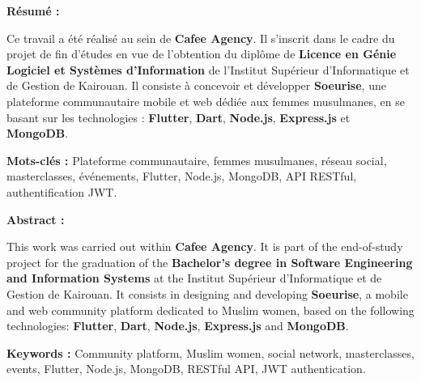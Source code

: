 \documentclass[12pt,a4paper]{report}
\begin{document}
\begin{tcolorbox}[enhanced,colback=white,colframe=cafeeNavy,boxrule=1pt,arc=4pt,left=10pt,right=10pt,top=10pt,bottom=10pt]
	\textbf{\large Résumé :}
	
	\medskip
	
	Ce travail a été réalisé au sein de \textbf{Cafee Agency}. Il s'inscrit dans le cadre du projet de fin d'études en vue de l'obtention 
	du diplôme de \textbf{Licence en Génie Logiciel et Systèmes d'Information} de 
	l'Institut Supérieur d'Informatique et de Gestion de Kairouan. Il consiste à 
	concevoir et développer \textbf{Soeurise}, une plateforme communautaire mobile et 
	web dédiée aux femmes musulmanes, en se basant sur les technologies : 
	\textbf{Flutter}, \textbf{Dart}, \textbf{Node.js}, \textbf{Express.js} et 
	\textbf{MongoDB}.
	
	\medskip
	
	\textbf{Mots-clés :} Plateforme communautaire, femmes musulmanes, réseau social, 
	masterclasses, événements, Flutter, Node.js, MongoDB, API RESTful, authentification JWT.
\end{tcolorbox}

\vspace{1cm}

\begin{tcolorbox}[enhanced,colback=white,colframe=primaryPurple,boxrule=1pt,arc=4pt,left=10pt,right=10pt,top=10pt,bottom=10pt]
	\textbf{\large Abstract :}
	
	\medskip
	
	This work was carried out within \textbf{Cafee Agency}. It is part of the end-of-study project for the graduation 
	of the \textbf{Bachelor's degree in Software Engineering and Information Systems} 
	at the Institut Supérieur d'Informatique et de Gestion de Kairouan. It consists 
	in designing and developing \textbf{Soeurise}, a mobile and web community platform 
	dedicated to Muslim women, based on the following technologies: \textbf{Flutter}, 
	\textbf{Dart}, \textbf{Node.js}, \textbf{Express.js} and \textbf{MongoDB}.
	
	\medskip
	
	\textbf{Keywords :} Community platform, Muslim women, social network, masterclasses, 
	events, Flutter, Node.js, MongoDB, RESTful API, JWT authentication.
\end{tcolorbox}
\end{document}
